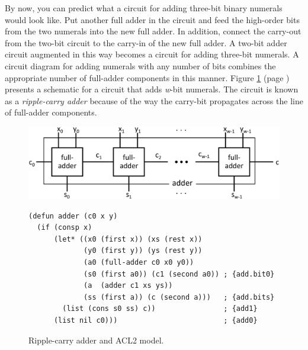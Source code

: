By now, you can predict what a circuit for adding three-bit
binary numerals would look like.
Put another full adder in the circuit and feed the
high-order bits from the two numerals into the new full adder.
In addition, connect the carry-out from the two-bit circuit
to the carry-in of the new full adder.
A two-bit adder circuit augmented in this way
becomes a circuit for adding three-bit numerals.
A circuit diagram for adding numerals with any number of bits
combines the appropriate number of
full-adder components in this manner.
Figure \ref{fig:adder} (page \pageref{fig:adder}) presents a schematic
for a circuit that adds \emph{w}-bit numerals.
The circuit is known as a \emph{ripple-carry adder} because
of the way the carry-bit propagates across the line
of full-adder components.

\begin{figure}
\begin{center}
\includegraphics[scale=1]{images-cmyk/adder}
\begin{code}
\begin{verbatim}
(defun adder (c0 x y)
  (if (consp x)
      (let* ((x0 (first x)) (xs (rest x))
             (y0 (first y)) (ys (rest y))
             (a0 (full-adder c0 x0 y0))
             (s0 (first a0)) (c1 (second a0)) ; {add.bit0}
             (a  (adder c1 xs ys))
             (ss (first a)) (c (second a)))   ; {add.bits}
        (list (cons s0 ss) c))                ; {add1}
      (list nil c0)))                         ; {add0}
\end{verbatim}
\end{code}
\end{center}
\caption{Ripple-carry adder and ACL2 model.}
\label{fig:adder}
\end{figure}

